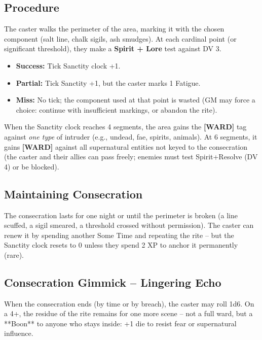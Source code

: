 \documentclass[10pt,a5paper]{book}
\begin{document}
\subsection*{Procedure}

The caster walks the perimeter of the area, marking it with the chosen component (salt line, chalk sigils, ash smudges). At each cardinal point (or significant threshold), they make a \textbf{Spirit + Lore} test against DV 3.

\begin{itemize}
    \item \textbf{Success:} Tick Sanctity clock +1.
    \item \textbf{Partial:} Tick Sanctity +1, but the caster marks 1 Fatigue.
    \item \textbf{Miss:} No tick; the component used at that point is wasted (GM may force a choice: continue with insufficient markings, or abandon the rite).
\end{itemize}

When the Sanctity clock reaches 4 segments, the area gains the \textbf{[WARD]} tag against \textit{one type} of intruder (e.g., undead, fae, spirits, animals). At 6 segments, it gains \textbf{[WARD]} against all supernatural entities not keyed to the consecration (the caster and their allies can pass freely; enemies must test Spirit+Resolve (DV 4) or be blocked).

\subsection*{Maintaining Consecration}

The consecration lasts for one night or until the perimeter is broken (a line scuffed, a sigil smeared, a threshold crossed without permission). The caster can renew it by spending another Some Time and repeating the rite – but the Sanctity clock resets to 0 unless they spend 2 XP to anchor it permanently (rare).

\subsection*{Consecration Gimmick – Lingering Echo}

When the consecration ends (by time or by breach), the caster may roll 1d6. On a 4+, the residue of the rite remains for one more scene – not a full ward, but a **Boon** to anyone who stays inside: +1 die to resist fear or supernatural influence.

\clearpage
\end{document}

